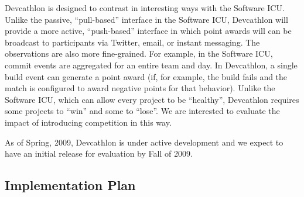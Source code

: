 Devcathlon is designed to contrast in interesting ways with the Software
ICU.  Unlike the passive, ``pull-based'' interface in the Software ICU,
Devcathlon will provide a more active, ``push-based'' interface in which
point awards will can be broadcast to participants via Twitter, email, or
instant messaging.  The observations are also more fine-grained. For example, in the
Software ICU, commit events are aggregated for an entire team and day.  In
Devcathlon, a single build event can generate a point award (if, for
example, the build fails and the match is configured to award negative
points for that behavior).  Unlike the Software ICU, which can allow every
project to be ``healthy'', Devcathlon requires some projects to ``win'' and
some to ``lose''.  We are interested to evaluate the impact of introducing
competition in this way.

As of Spring, 2009, Devcathlon is under active development and we expect to
have an initial release for evaluation by Fall of 2009.


\subsection{Implementation Plan}
\label{sec:implementation}





